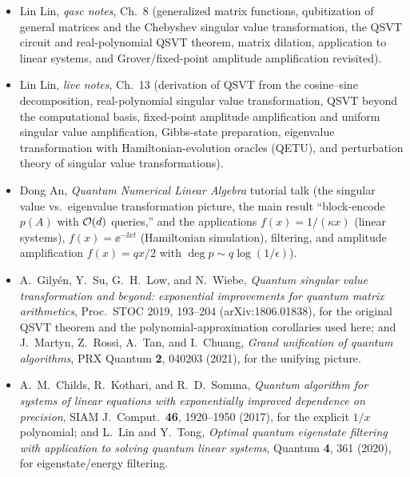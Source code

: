 \readingsection
\begin{itemize}[leftmargin=1.4em]
  \item Lin Lin, \emph{qasc notes}, Ch.~8 (generalized matrix functions, qubitization
        of general matrices and the Chebyshev singular value transformation, the QSVT
        circuit and real-polynomial QSVT theorem, matrix dilation, application to
        linear systems, and Grover/fixed-point amplitude amplification revisited).
  \item Lin Lin, \emph{live notes}, Ch.~13 (derivation of QSVT from the cosine--sine
        decomposition, real-polynomial singular value transformation, QSVT beyond the
        computational basis, fixed-point amplitude amplification and uniform singular
        value amplification, Gibbs-state preparation, eigenvalue transformation with
        Hamiltonian-evolution oracles (QETU), and perturbation theory of singular value
        transformations).
  \item Dong An, \emph{Quantum Numerical Linear Algebra} tutorial talk (the
        singular value vs.\ eigenvalue transformation picture, the main result
        ``block-encode $p(A)$ with $\mathcal{O}(d)$ queries,'' and the applications
        $f(x)=1/(\kappa x)$ (linear systems), $f(x)=\ee^{-\ii xt}$ (Hamiltonian
        simulation), filtering, and amplitude amplification $f(x)=qx/2$ with
        $\deg p\sim q\log(1/\epsilon)$).
  \item A.~Gily\'en, Y.~Su, G.~H.~Low, and N.~Wiebe, \emph{Quantum singular value
        transformation and beyond: exponential improvements for quantum matrix
        arithmetics}, Proc.\ STOC 2019, 193--204 (arXiv:1806.01838), for the original
        QSVT theorem and the polynomial-approximation corollaries used here; and
        J.~Martyn, Z.~Rossi, A.~Tan, and I.~Chuang, \emph{Grand unification of quantum
        algorithms}, PRX Quantum \textbf{2}, 040203 (2021), for the unifying picture.
  \item A.~M.~Childs, R.~Kothari, and R.~D.~Somma, \emph{Quantum algorithm for systems
        of linear equations with exponentially improved dependence on precision}, SIAM
        J.\ Comput.\ \textbf{46}, 1920--1950 (2017), for the explicit $1/x$ polynomial;
        and L.~Lin and Y.~Tong, \emph{Optimal quantum eigenstate filtering with
        application to solving quantum linear systems}, Quantum \textbf{4}, 361 (2020),
        for eigenstate/energy filtering.
\end{itemize}
